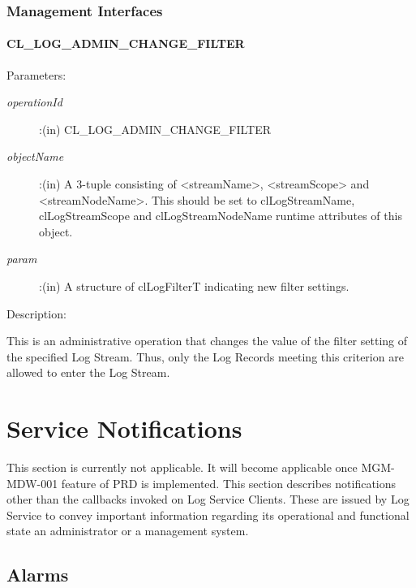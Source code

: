 \begin{flushleft}
\subsection{Management Interfaces}
\subsubsection{CL\_\-LOG\_\-ADMIN\_\-CHANGE\_\-FILTER}
\begin{Desc}
\item[Parameters:]
\begin{description}
\item[{\em operationId}]:(in) CL\_\-LOG\_\-ADMIN\_\-CHANGE\_\-FILTER
\item[{\em objectName}]:(in) A 3-tuple consisting of <streamName>, <streamScope> and <streamNodeName>. This should be set to clLogStreamName, 
clLogStreamScope and clLogStreamNodeName runtime attributes of this object.
\item[{\em param}]:(in) A structure of clLogFilterT indicating new filter settings.
\end{description}
\end{Desc}
\begin{Desc}
 \item[Description:]
\end{Desc}
This is an administrative operation that changes the value of the filter setting of the specified Log Stream. Thus, only the Log Records 
meeting this criterion are allowed to enter the Log Stream.





\chapter{Service Notifications}
This section is currently not applicable. It will become applicable once MGM-MDW-001 feature of PRD is implemented.
This section describes notifications other than the callbacks invoked on Log Service Clients. These are issued by Log Service to convey important 
information regarding its operational and functional state an administrator or a management system.



\section{Alarms}

\end{flushleft}
